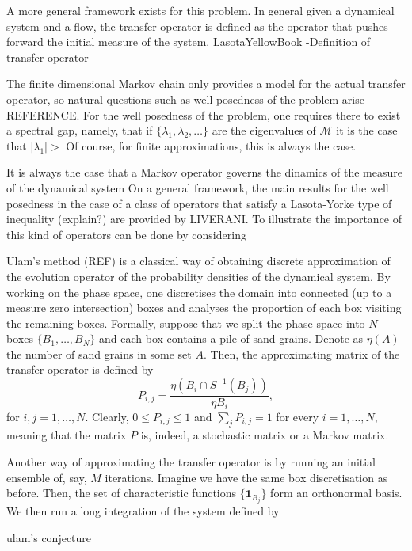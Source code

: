 A more general framework exists for this problem. In general given a dynamical system and a flow, the transfer operator is defined as the operator that pushes forward the initial measure of the system.
LasotaYellowBook
	-Definition of transfer operator

The finite dimensional Markov chain only provides a model for the actual transfer operator, so natural questions such as well posedness of the problem arise REFERENCE. For the well posedness of the problem, one requires there to exist a spectral gap, namely, that if $\{\lambda_1 , \lambda_2 , \ldots \}$ are the eigenvalues of $\mathcal{M}$ it is the case that $\vert \lambda _1 \vert >  $
Of course, for finite approximations, this is always the case.

It is always the case that a Markov operator governs the dinamics of the measure of the dynamical system On a general framework, the main results for the well posedness in the case of a class of operators that satisfy a Lasota-Yorke type of inequality (explain?) are provided by LIVERANI. To illustrate the importance of this kind of operators can be done by considering 

Ulam's method (REF) is a classical way of obtaining discrete approximation of the evolution operator of the probability densities of the dynamical system. By working on the phase space, one discretises the domain into connected (up to a measure zero intersection) boxes and analyses the proportion of each box visiting the remaining boxes. Formally, suppose that we split the phase space into $N$ boxes $\{B_1,\ldots,B_N\}$ and each box contains a pile of sand grains. Denote as $\eta (A)$ the number of sand grains in some set $A$. Then, the approximating matrix of the transfer operator is defined by
\begin{equation}
	P_{i,j}=\frac{\eta(B_i \cap S^{-1}(B_j))}{\eta B_i},
\end{equation}
for $i,j=1,\ldots , N$. Clearly, $0\leq P_{i,j}\leq 1$ and $\sum _j P_{i,j}=1$ for every $i=1,\ldots , N,$ meaning that the matrix $P$ is, indeed, a stochastic matrix or a Markov matrix.

Another way of approximating the transfer operator is by running an initial ensemble of, say, $M$ iterations. Imagine we have the same box discretisation as before. Then, the set of characteristic functions $\{\mathbf{1}_{B_j}\}$ form an orthonormal basis. We then run a long integration of the system defined by


ulam's conjecture






